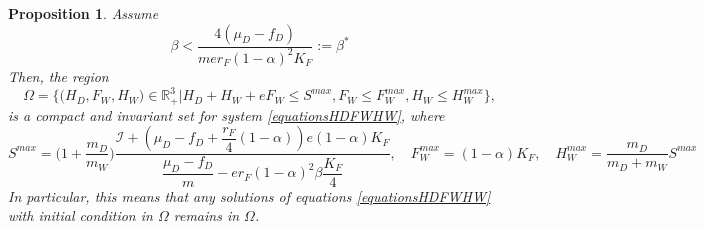 \documentclass{article}
\newcommand{\cI}{\mathcal{I}}
\newtheorem{prop}{Proposition}
\begin{document}
\begin{prop}\label{invariantRegion} 
Assume 
\begin{equation}
\beta < \dfrac{4(\mu_D - f_D)}{m e r_F (1-\alpha)^2 K_F} := \beta^*
\label{Beta}
\end{equation}
Then, the region
$$\Omega = \Big\{\Big(H_D, F_W, H_W \Big) \in \mathbb{R}_+^3  \Big|H_D + H_W + eF_W \leq S^{max}, F_W \leq F_W^{max}, H_W \leq H_W^{max} \Big\},$$
is a compact and invariant set for system \eqref{equationsHDFWHW}, 
where
$$
S^{max} = \Big(1 + \dfrac{m_D}{m_W} \Big) \dfrac{\cI + \left(\mu_D - f_D + \dfrac{r_F}{4}(1-\alpha) \right) e (1-\alpha)K_F }{\dfrac{\mu_D - f_D}{m} - er_F (1-\alpha)^2 \beta \dfrac{K_F}{4}},
\quad
F_W^{max} = (1-\alpha)K_F,
\quad
H_W^{max} = \dfrac{m_D}{m_D + m_W} S^{max}
$$
In particular, this means that any solutions of equations \eqref{equationsHDFWHW} with initial condition in $\Omega$ remains in $\Omega$.
\end{prop}
%
\end{document}
